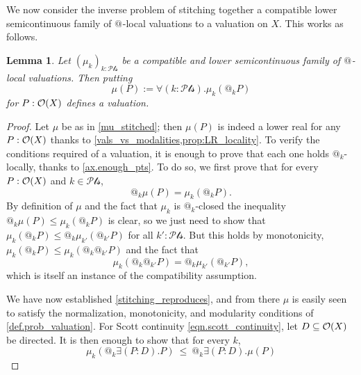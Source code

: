 \documentclass[11pt, oneside, article]{memoir}
\makeatletter
\theoremstyle{plain}
\newtheorem{lemma}[theorem]{Lemma}
\theoremstyle{definition}
\theoremstyle{remark}
\renewcommand{\ss}{\subseteq}
\newcommand{\Op}[1][undef]{\ifthenelse{\equal{#1}{undef}}{\mathcal{O}}{\mathcal{O}(#1)}}
\newcommand{\pt}{k}				%
\newcommand{\Pts}{\mathcal{Pts}}		%
\newcommand{\AtSymbol}{{@}}
\newcommand{\At}[1][\pt]{\AtSymbol_{#1}}
\makeatother
\begin{document}
We now consider the inverse problem of stitching together a compatible lower semicontinuous family of $\At[]$-local valuations to a valuation on $X$. This works as follows.

\begin{lemma}\label{lemma.compat_lowersemi_stitched}
	Let $(\mu_\pt)_{\pt : \Pts}$ be a compatible and lower semicontinuous family of $\At[]$-local valuations. Then putting
	\begin{equation}
		\label{mu_stitched}
		\mu(P) := \forall (\pt : \Pts) . \mu_\pt(\At P)
	\end{equation}
	for $P : \Op[X]$ defines a valuation.
\end{lemma}

\begin{proof}
	Let $\mu$ be as in \eqref{mu_stitched}; then $\mu(P)$ is indeed a lower real for any $P:\Op[X]$ thanks to \cref{vals_vs_modalities,prop:LR_locality}. To verify the conditions required of a valuation, it is enough to prove that each one holds $\At$-locally, thanks to \cref{ax.enough_pts}. To do so, we first prove that for every $P : \Op[X]$ and $\pt\in\Pts$,
	\begin{equation}
		\label{stitching_reproduces}
		\At \mu(P) = \mu_\pt(\At P).
	\end{equation}
	By definition of $\mu$ and the fact that $\mu_\pt$ is $\At$-closed the inequality $\At \mu(P) \le \mu_\pt(\At P)$ is clear, so we just need to show that $\mu_\pt(\At P) \le \At \mu_{\pt'}(\At[\pt'] P)$ for all $\pt' : \Pts$. But this holds by monotonicity, $\mu_\pt(\At P)\leq\mu_\pt(\At\At[\pt']P)$ and the fact that
	\[
		\mu_\pt(\At \At[\pt'] P) = \At \mu_{\pt'}(\At[\pt'] P),
	\]
	which is itself an instance of the compatibility assumption.

	We have now established \eqref{stitching_reproduces}, and from there $\mu$ is easily seen to satisfy the normalization, monotonicity, and modularity conditions of \cref{def.prob_valuation}. For Scott continuity \eqref{eqn.scott_continuity}, let $D \ss \Op[X]$ be directed. It is then enough to show that for every $\pt$,
	\begin{equation}
		\label{goal_continuous}
		\mu_\pt(\At \exists (P : D) . P) \: \le \: \At \exists (P : D). \mu(P)
	\end{equation}


\end{proof}
\end{document}
